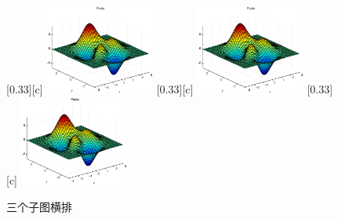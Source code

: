 \documentclass{article}
\begin{document}
    \begin{figure}[!htbp]
        \centering
        [0.33\textwidth][c]{
            \centering
            \includegraphics[width=0.32\textwidth]{example}
            \label{}
        }%
            [0.33\textwidth][c]{
            \centering
            \includegraphics[width=0.32\textwidth]{example}
            \label{}
        }%
            [0.33\textwidth][c]{
            \centering
            \includegraphics[width=0.32\textwidth]{example}
            \label{}
        }%
        \caption{三个子图横排}
        \label{}
    \end{figure}
\end{document}
